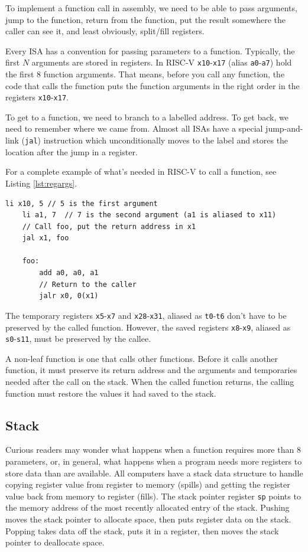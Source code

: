 To implement a function call in assembly, we need to be
able to pass arguments, jump to the function, return from
the function, put the result somewhere the caller can see
it, and least obviously, split/fill registers.

Every ISA has a convention for passing parameters to a
function. Typically, the first $N$ arguments are stored
in registers. In RISC-V \texttt{x10}-\texttt{x17}
(alias \texttt{a0}-\texttt{a7}) hold the first 8
function arguments. That means, before you call any
function, the code that calls the function puts the
function arguments in the right order in the registers
\texttt{x10}-\texttt{x17}.

To get to a function, we need to branch to a labelled address.
To get back, we need to remember where we came from. Almost
all ISAs have a special jump-and-link (\texttt{jal}) instruction
which unconditionally moves to the label and stores the location
after the jump in a register.

For a complete example of what's needed in RISC-V to call a function,
see Listing \ref{lst:regargs}.
\begin{lstlisting}[caption={Arguments in Registers}, label={lst:regargs}]
    li x10, 5 // 5 is the first argument
    li a1, 7  // 7 is the second argument (a1 is aliased to x11)
    // Call foo, put the return address in x1
    jal x1, foo

    foo:
        add a0, a0, a1
        // Return to the caller
        jalr x0, 0(x1)
\end{lstlisting}

The temporary registers \texttt{x5}-\texttt{x7} and \texttt{x28}-\texttt{x31},
aliased as \texttt{t0}-\texttt{t6} don't have to be preserved by the called
function. However, the saved registers \texttt{x8}-\texttt{x9}, aliased as
\texttt{s0}-\texttt{s11}, must be preserved by the callee.

A non-leaf function is one that calls other functions. Before it calls
another function, it must preserve its return address and the arguments
and temporaries needed after the call on the stack. When the called function
returns, the calling function must restore the values it had saved to the stack.

\subsection{Stack}

Curious readers may wonder what happens when a function requires more
than 8 parameters, or, in general, what happens when a program needs
more registers to store data than are available. All computers have a
stack data structure to handle copying register value from register to
memory (spills) and getting the register value back from memory to register
(fills). The stack pointer register \texttt{sp} points to the memory address
of the most recently allocated entry of the stack. Pushing moves the stack
pointer to allocate space, then puts register data on the stack. Popping
takes data off the stack, puts it in a register, then moves the stack
pointer to deallocate space.

